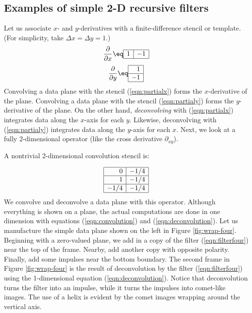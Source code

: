 \subsection{Examples of simple 2-D recursive filters}
Let us associate $x$- and $y$-derivatives with
a finite-difference stencil or template.
(For simplicity, take $\Delta x=\Delta y=1$.)
\begin{equation}
 \frac{\partial }{ \partial x } \eq
 \begin{array}{|c|c|} \hline
   1    & -1
   \\ \hline
 \end{array}
 \label{eqn:partialx}
\end{equation}
\begin{equation}
 \frac{\partial }{ \partial y } \eq
  \begin{array}{|r|} \hline
    1  \\
    \hline
    -1
    \\ \hline
  \end{array}
  \label{eqn:partialy}
\end{equation}
Convolving a data plane with
the stencil (\ref{eqn:partialx})
forms the $x$-derivative of the plane.
Convolving a data plane with
the stencil (\ref{eqn:partialy})
forms the $y$-derivative of the plane.
On the other hand,
{\it deconvolving}
with (\ref{eqn:partialx}) integrates data along the $x$-axis for each $y$.
Likewise, deconvolving
with (\ref{eqn:partialy}) integrates data along the $y$-axis for each $x$.
Next, we look at a fully 2-dimensional operator
(like the cross derivative $\partial_{xy}$).


\par
A nontrivial 2-dimensional convolution stencil is:
\par
\begin{equation}
        \begin{array}{|r|r|}   \hline
                0    & -1/4 \\
                \hline
                1    & -1/4 \\
                \hline
                -1/4 & -1/4
                \\ \hline
        \end{array}
\label{eqn:filterfour}
\end{equation}
We convolve and deconvolve a data plane with this operator.
Although everything is shown on a plane,
the actual computations are done in one dimension
with equations
(\ref{eqn:convolution}) and
(\ref{eqn:deconvolution}).
Let us manufacture the simple data plane
shown on the left in Figure \ref{fig:wrap-four}.
Beginning with a zero-valued plane, we add
in a copy of the filter (\ref{eqn:filterfour})
near the top of the frame.
Nearby, add another copy with opposite polarity.
Finally, add some impulses near the bottom boundary.
The second frame in Figure \ref{fig:wrap-four} is the result
of deconvolution by the filter (\ref{eqn:filterfour})
using the 1-dimensional equation (\ref{eqn:deconvolution}).
Notice that deconvolution
turns the filter into an impulse,
while it turns the impulses
into comet-like images.
The use of a helix is evident
by the comet images wrapping around the vertical axis.


